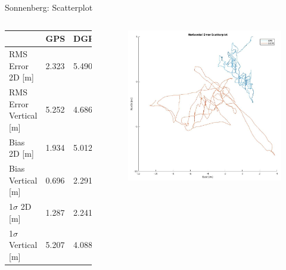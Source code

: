 \documentclass[12pt, compress, xcolor=table]{beamer}
\begin{document}
\begin{frame}{Sonnenberg: Scatterplot}
 \begin{columns}
  
  \begin{table}[]
  \centering
  \scriptsize
  \begin{tabular}{l|ll}
			     & GPS   & DGPS  \\ \hline
  RMS Error 2D {[}m{]}       & 2.323 & 5.490 \\
  RMS Error Vertical {[}m{]} & 5.252 & 4.686 \\
  Bias 2D {[}m{]}            & 1.934 & 5.012 \\
  Bias Vertical {[}m{]}      & 0.696 & 2.291 \\
  1$\sigma$ 2D {[}m{]}       & 1.287 & 2.241 \\
  1$\sigma$ Vertical {[}m{]} & 5.207 & 4.088
  \end{tabular}
  \end{table}
  
  \begin{figure}
   \centering
   \includegraphics[width=\textwidth]{images/Scatterplot_Sonnenberg.png}
  \end{figure}
  
 \end{columns}
\end{frame}
\end{document}

